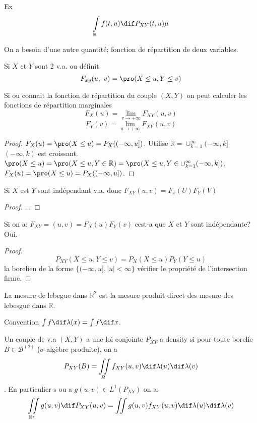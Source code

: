 Ex
$$\int\limits_{\mathbb{R}} f(t,u) \dif P_{XY}(t, u)\mu$$

On a besoin d'une autre quantité; fonction de répartition de deux variables.

\begin{definition}
	Si $X$ et $Y$ sont 2 v.a. ou définit
	$$F_{xy}(u,\ v)=\pro (X\leq u, Y\leq v)$$
\end{definition}

\begin{proposition}
	Si ou connait la fonction de répartition du couple $(X,Y)$ on peut calculer les fonctions de répartition marginales
	$$F_X(u)=\lim\limits_{v\rightarrow +\infty}F_{XY}(u, v)$$
	$$F_Y(v)=\lim\limits_{u\rightarrow +\infty}F_{XY}(u, v)$$
\end{proposition}
\begin{proof}
	$F_X(u)=\pro (X\leq u)=P_X((-\infty, u])$. Utilise $\mathbb{R}=\cup^\infty_{k=1}(-\infty, k]$ $(-\infty, k)$ est croissant. $\pro (X\leq u)=\pro (X\leq u, Y\in\mathbb{R})=\pro (X\leq u, Y\in\cup_{k=1}^\infty(-\infty, k])$. $F_X(u)=\pro (X\leq u)=P_X((-\infty, u])$.
\end{proof}

\begin{proposition}
	Si $X$ est $Y$ sont indépendant v.a. donc $F_{XY}(u, v)=F_x(U) F_Y(V)$
\end{proposition}
\begin{proof}
	...
\end{proof}

\begin{proposition}	
	Si on a: $F_{XY}=(u, v)=F_X(u)F_Y(v)$ cest-a que $X$ et $Y$ sont indépendante? Oui.
\end{proposition}
\begin{proof}
	$$P_{XY}(X\leq u, Y\leq v)=P_X(X\leq u)P_Y(Y\leq u)$$
	la borelien de la forme $\{(-\infty, u], |u|<\infty\}$ vérifier le propriété de l'intersection firme.
\end{proof}

\begin{definition}
	La mesure de lebegue dans $\mathbb{R}^2$ est la mesure produit direct des mesure des lebesgue dans $\mathbb{R}$.
\end{definition}

Convention $\int f\dif \lambda(x)=\int f \dif x$.

\begin{definition}
	Un couple de v.a $(X, Y)$ a une loi conjointe $P_{XY}$ a density si pour toute borelie $B\in\mathcal{B}^{(2)}$ ($\sigma$-algèbre produite), on a
	$$P_{XY}(B)=\iint\limits_{B}f_{XY}(u, v)\dif\lambda(u)\dif\lambda(v)$$. En particulier s ou a $g(u,v)\in L^1(P_{XY})$ on a:
	$$\iint\limits_{\mathbb{R}^2}g(u, v)\dif P_{XY}(u, v)=\iint g(u,v) f_{XY}(u, v)\dif \lambda(u) \dif \lambda(v)$$
\end{definition}

